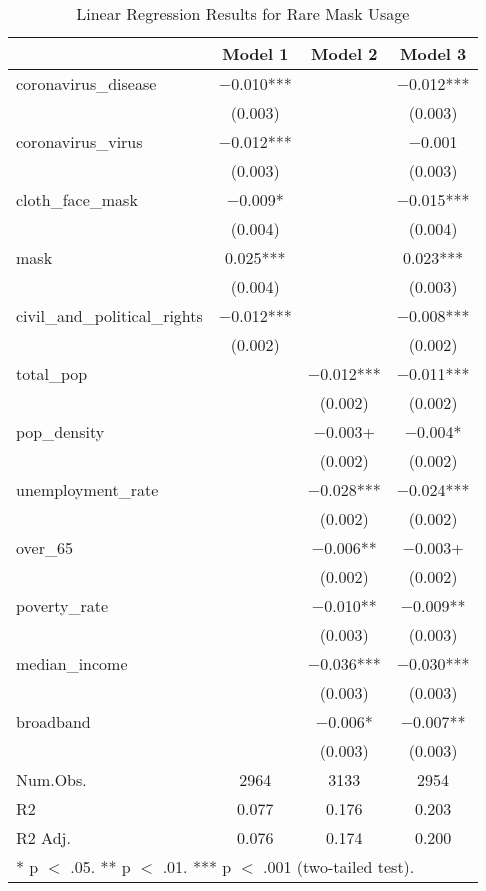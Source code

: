 \begin{table}[!h]

\caption{\label{tab:mask_analysis}Linear Regression Results for Rare Mask Usage}
\centering
\fontsize{8}{10}\selectfont

\begin{tabular}{lccc}
\toprule
  & Model 1 & Model 2 & Model 3\\
\midrule

coronavirus\_disease & \num{-0.010}*** &  & \num{-0.012}***\\
 & (\num{0.003}) &  & \vphantom{1} (\num{0.003})\\
coronavirus\_virus & \num{-0.012}*** &  & \num{-0.001}\\
 & (\num{0.003}) &  & (\num{0.003})\\
cloth\_face\_mask & \num{-0.009}* &  & \num{-0.015}***\\
 & (\num{0.004}) &  & (\num{0.004})\\
mask & \num{0.025}*** &  & \num{0.023}***\\
 & (\num{0.004}) &  & (\num{0.003})\\
civil\_and\_political\_rights & \num{-0.012}*** &  & \num{-0.008}***\\
 & (\num{0.002}) &  & (\num{0.002})\\
total\_pop &  & \num{-0.012}*** & \num{-0.011}***\\
 &  & (\num{0.002}) & \vphantom{3} (\num{0.002})\\
pop\_density &  & \num{-0.003}+ & \num{-0.004}*\\
 &  & (\num{0.002}) & \vphantom{2} (\num{0.002})\\
unemployment\_rate &  & \num{-0.028}*** & \num{-0.024}***\\
 &  & (\num{0.002}) & \vphantom{1} (\num{0.002})\\
over\_65 &  & \num{-0.006}** & \num{-0.003}+\\
 &  & (\num{0.002}) & (\num{0.002})\\
poverty\_rate &  & \num{-0.010}** & \num{-0.009}**\\
 &  & (\num{0.003}) & \vphantom{2} (\num{0.003})\\
median\_income &  & \num{-0.036}*** & \num{-0.030}***\\
 &  & (\num{0.003}) & \vphantom{1} (\num{0.003})\\
broadband &  & \num{-0.006}* & \num{-0.007}**\\
 &  & (\num{0.003}) & (\num{0.003})\\
\midrule
Num.Obs. & \num{2964} & \num{3133} & \num{2954}\\
R2 & \num{0.077} & \num{0.176} & \num{0.203}\\
R2 Adj. & \num{0.076} & \num{0.174} & \num{0.200}\\
\bottomrule
\multicolumn{4}{l}{\rule{0pt}{1em}* p $<$ .05. ** p $<$ .01. *** p $<$ .001 (two-tailed test).}\\
\end{tabular}
\end{table}